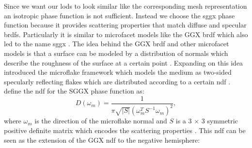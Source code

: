 Since we want our \acp{lod} to look similar like the corresponding mesh representation an isotropic phase function is not sufficient.
Instead we choose the \acs{sggx} phase function \cite{sggx} because it provides scattering properties that match diffuse and specular \acsp{brdf}.
Particularly it is similar to microfacet models like the GGX \acs{brdf} \cite{ggx} which also led to the name \acf{sggx} \cite[p. 1]{sggx}.
The idea behind the GGX \ac{brdf} and other microfacet models is that a surface can be modeled by a distribution of normals which describe the roughness of the surface at a certain point \cite[p. 3]{ggx}.
Expanding on this idea \citeauthor{microflake} introduced the microflake framework which models the medium as two-sided specularly reflecting flakes which are distributed according to a certain \ac{ndf} \cite[pp. 4-5]{microflake}.
\citeauthor{sggx} define the \ac{ndf} for the SGGX phase function as:
\begin{equation}
    D(\omega_m)=\frac{1}{\pi \sqrt{|S|}(\omega_m^T S^{-1} \omega_m)^2},
\end{equation}
where $\omega_m$ is the direction of the microflake normal and $S$ is a 3 $\times$ 3 symmetric positive definite matrix which encodes the scattering properties \cite[p. 4]{sggx}.
This \ac{ndf} can be seen as the extension of the GGX \acs{ndf} to the negative hemisphere:

